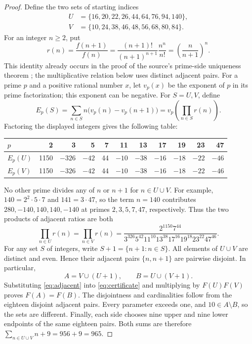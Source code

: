 \documentclass[11pt]{article}
\begin{document}
\begin{proof}
Define the two sets of starting indices
\begin{align*}
 U&=\{16,20,22,26,44,64,76,94,140\},\\
 V&=\{10,24,38,46,48,56,68,80,84\}.
\end{align*}
For an integer $n\geq2$, put
\begin{equation}\label{eq:adjacent}
 r(n)=\frac{f(n+1)}{f(n)}
 =\frac{(n+1)!}{(n+1)^{n+1}}\frac{n^n}{n!}
 =\left(\frac{n}{n+1}\right)^n.
\end{equation}
This identity already occurs in the proof of the source's prime-side
uniqueness theorem \cite[Theorem~4.6, p.~1263]{ALM}; the multiplicative
relation below uses distinct adjacent pairs.
For a prime $p$ and a positive rational number $x$, let $v_p(x)$ be the
exponent of $p$ in its prime factorization; this exponent can be negative.
For $S=U,V$, define
\[
 E_p(S)=\sum_{n\in S} n\bigl(v_p(n)-v_p(n+1)\bigr)
       =v_p\!\left(\prod_{n\in S}r(n)\right).
\]
Factoring the displayed integers gives the following table:
\begin{center}
\small
\setlength{\tabcolsep}{4.3pt}
\begin{tabular}{@{}lrrrrrrrrrr@{}}
\toprule
$p$ &2&3&5&7&11&13&17&19&23&47\\
\midrule
$E_p(U)$ &1150&$-326$&$-42$&44&$-10$&$-38$&$-16$&$-18$&$-22$&$-46$\\
$E_p(V)$ &1150&$-326$&$-42$&44&$-10$&$-38$&$-16$&$-18$&$-22$&$-46$\\
\bottomrule
\end{tabular}
\end{center}
No other prime divides any of $n$ or $n+1$ for $n\in U\cup V$.
For example, $140=2^2\cdot5\cdot7$ and $141=3\cdot47$, so the
term $n=140$ contributes $280, -140, 140, 140, -140$ at primes
$2,3,5,7,47$, respectively. Thus the two products of adjacent ratios are
both
\begin{equation}\label{eq:certificate}
 \prod_{n\in U}r(n)=\prod_{n\in V}r(n)
 =\frac{2^{1150}7^{44}}
 {3^{326}5^{42}11^{10}13^{38}17^{16}19^{18}23^{22}47^{46}}.
\end{equation}
For any set $S$ of integers, write $S+1=\{n+1:n\in S\}$.
All elements of $U\cup V$ are distinct and even. Hence their adjacent
pairs $\{n,n+1\}$ are pairwise disjoint. In particular,
\[
 A=V\cup(U+1),\qquad B=U\cup(V+1).
\]
Substituting \eqref{eq:adjacent} into \eqref{eq:certificate} and multiplying
by $F(U)F(V)$ proves $F(A)=F(B)$. The disjointness and cardinalities follow
from the eighteen disjoint adjacent pairs. Every parameter exceeds one,
and $10\in A\setminus B$, so the sets are different.
Finally, each side chooses nine upper and nine lower endpoints of the same
eighteen pairs. Both sums are therefore
$\sum_{n\in U\cup V}n+9=956+9=965$.
\end{proof}
\end{document}
